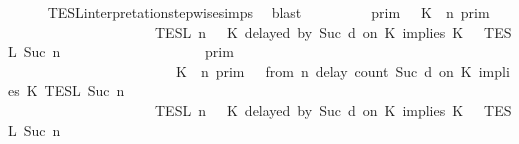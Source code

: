 \begin{isabellebody}
\ \ \ \ \isamarkupfalse%
\ TESL{\isacharunderscore}interpretation{\isacharunderscore}stepwise{\isachardot}simps{\isacharparenleft}{}{\isacharparenright}\ \isamarkupfalse%
\ blast\isanewline
\ \ \isamarkupfalse%
\ \isamarkupfalse%
\ {\isacartoucheopen}{\isachardot}{\isachardot}{\isachardot}\ {\isacharequal}\ {\isacharparenleft}{\isasymlbrakk}{\isasymlbrakk}\ {\isasymGamma}\ {\isasymrbrakk}{\isasymrbrakk}\isactrlsub p\isactrlsub r\isactrlsub i\isactrlsub m\ {\isasyminter}\ {\isasymlbrakk}\ K\ {\isasymnot}{\isasymUp}\ n\ {\isasymrbrakk}\isactrlsub p\isactrlsub r\isactrlsub i\isactrlsub m\isanewline
\ \ \ \ \ \ \ \ \ \ \ \ \ \ \ \ \ \ {\isasyminter}\ {\isasymlbrakk}{\isasymlbrakk}\ {\isasymPsi}\ {\isasymrbrakk}{\isasymrbrakk}\isactrlsub T\isactrlsub E\isactrlsub S\isactrlsub L\isactrlbsup {\isasymge}\ n\isactrlesup \ {\isasyminter}\ {\isasymlbrakk}{\isasymlbrakk}\ {\isacharparenleft}K\ delayed\ by\ {\isacharparenleft}Suc\ d{\isacharparenright}\ on\ K\ implies\ K\ {\isacharhash}\ {\isasymPhi}\ {\isasymrbrakk}{\isasymrbrakk}\isactrlsub T\isactrlsub E\isactrlsub S\isactrlsub L\isactrlbsup {\isasymge}\ Suc\ n\isactrlesup {\isacharparenright}\isanewline
\ \ \ \ \ \ \ \ \ \ \ \ \ \ \ \ \ {\isasymunion}\ {\isacharparenleft}{\isasymlbrakk}{\isasymlbrakk}\ {\isasymGamma}\ {\isasymrbrakk}{\isasymrbrakk}\isactrlsub p\isactrlsub r\isactrlsub i\isactrlsub m\isanewline
\ \ \ \ \ \ \ \ \ \ \ \ \ \ \ \ \ \ \ \ \ \ {\isasyminter}\ {\isacharparenleft}{\isasymlbrakk}\ K\ {\isasymUp}\ n\ {\isasymrbrakk}\isactrlsub p\isactrlsub r\isactrlsub i\isactrlsub m\ {\isasyminter}\ {\isasymlbrakk}\ from\ n\ delay\ count\ {\isacharparenleft}Suc\ d{\isacharparenright}\ on\ K\ implies\ K\ {\isasymrbrakk}\isactrlsub T\isactrlsub E\isactrlsub S\isactrlsub L\isactrlbsup {\isasymge}\ Suc\ n\isactrlesup {\isacharparenright}\isanewline
\ \ \ \ \ \ \ \ \ \ \ \ \ \ \ \ \ \ {\isasyminter}\ {\isasymlbrakk}{\isasymlbrakk}\ {\isasymPsi}\ {\isasymrbrakk}{\isasymrbrakk}\isactrlsub T\isactrlsub E\isactrlsub S\isactrlsub L\isactrlbsup {\isasymge}\ n\isactrlesup \ {\isasyminter}\ {\isasymlbrakk}{\isasymlbrakk}\ {\isacharparenleft}K\ delayed\ by\ {\isacharparenleft}Suc\ d{\isacharparenright}\ on\ K\ implies\ K\ {\isacharhash}\ {\isasymPhi}\ {\isasymrbrakk}{\isasymrbrakk}\isactrlsub T\isactrlsub E\isactrlsub S\isactrlsub L\isactrlbsup {\isasymge}\ Suc\ n\isactrlesup \isanewline

\end{isabellebody}

